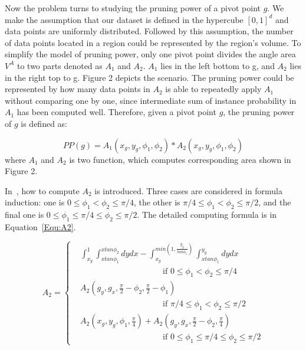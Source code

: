 Now the problem turns to studying the pruning power of a pivot point $g$. We make the assumption that our dataset is defined in the hypercube $[0,1]^d$ and data points are uniformly distributed. Followed by this assumption, the number of data points located in a region could be represented by the region's volume. To simplify the model of pruning power, only one pivot point divides the angle area $V^A$ to two parts denoted as $A_1$ and $A_2$. $A_1$ lies in the left bottom to g, and $A_2$ lies in the right top to g. Figure 2 depicts the scenario. The pruning power could be represented by how many data points in $A_2$ is able to repeatedly apply $A_1$ without comparing one by one, since intermediate sum of instance probability in $A_1$ has been computed well. Therefore, given a pivot point $g$, the pruning power of $g$ is defined as:

\begin{equation}
PP(g) = A_1(x_g, y_g, \phi_1, \phi_2) * A_2(x_g, y_g, \phi_1, \phi_2)
\end{equation}
where $A_1$ and $A_2$ is two function, which computes corresponding area shown in Figure 2.

In~\cite{ref:AngularPartition}, how to compute $A_2$ is introduced. Three cases are considered in formula induction: one is $0 \leq \phi_1 < \phi_2 \leq \pi/4$, the other is $\pi/4 \leq \phi_1 < \phi_2 \leq \pi/2$, and the final one is $0 \leq \phi_1 \leq \pi/4 \le \phi_2 \leq \pi/2$. The detailed computing formula is in Equation~\ref{Equ:A2}.

\begin{equation}
\label{Equ:A2}
A_2 = 
\begin{cases}
& \int_{x_g}^{1} \int_{x tan \phi_1}^{x tan \phi_2} dydx- \int_{x_g}^{min(1, \frac{y_g}{tan \phi_1})} \int_{x tan \phi_1}^{y_g} dydx  \\
& \qquad \qquad \qquad \qquad \qquad \mbox{if } 0 \leq \phi_1 < \phi_2 \leq \pi/4 \\ 
& A_2(g_y, g_x, \frac{\pi}{2} - \phi_2, \frac{\pi}{2} - \phi_1)\\
& \qquad \qquad \qquad \qquad \qquad \mbox{if } \pi/4 \leq \phi_1 < \phi_2 \leq \pi/2 \\
& A_2(x_g, y_g, \phi_1, \frac{\pi}{4}) + A_2(g_y, g_x, \frac{\pi}{2} - \phi_2, \frac{\pi}{4}) \\
& \qquad \qquad \qquad \qquad \qquad \mbox{if } 0 \leq \phi_1 \leq \pi/4 \le \phi_2 \leq \pi/2
\end{cases}
\end{equation}

